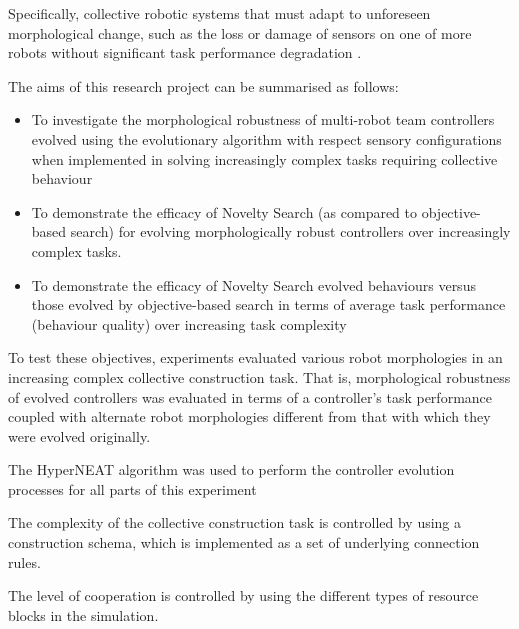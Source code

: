 Specifically, collective robotic systems that must adapt to unforeseen morphological change, such as the loss or damage of sensors on one of more robots without significant task performance degradation \cite{BongardZykovLipson2006} \cite{CullyCluneTaraporeMouret2015}.

The aims of this research project can be summarised as follows:
\begin{itemize}
	\item To investigate the morphological robustness of multi-robot team controllers evolved using the evolutionary algorithm with respect sensory configurations when implemented in solving increasingly complex tasks requiring collective behaviour
	\item To demonstrate the efficacy of Novelty Search (as compared to objective-based search) for evolving morphologically robust controllers over increasingly complex tasks.
	\item To demonstrate the efficacy of Novelty Search evolved behaviours versus those evolved by objective-based search in terms of average task performance (behaviour quality) over increasing task complexity
\end{itemize}


To test these objectives, experiments evaluated various robot morphologies in an increasing complex collective construction task. 
That is, morphological robustness of evolved controllers was evaluated in terms of a controller's task performance coupled with alternate robot morphologies different from that with which they were evolved originally.

The HyperNEAT algorithm \cite{StanleyDAmbrosioGauci2009} was used to perform the controller evolution processes for all parts of this experiment

The complexity of the collective construction task is controlled by using a construction schema, which is implemented as a set of underlying connection rules. 

The level of cooperation is controlled by using the different types of resource blocks in the simulation.

